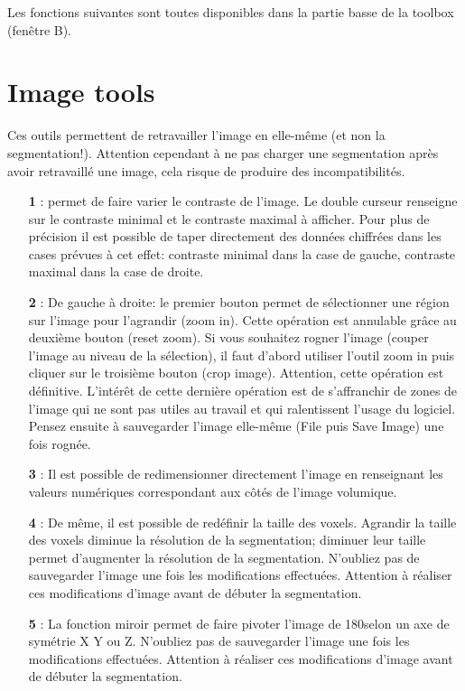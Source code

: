 \documentclass {article}
\begin{document}
Les fonctions suivantes sont toutes disponibles dans la partie basse de la toolbox (fenêtre B).

\section{Image tools}

Ces outils permettent de retravailler l'image en elle-même (et non la segmentation!). Attention cependant à ne pas charger une segmentation après avoir retravaillé une image, cela risque de produire des incompatibilités.

\begin{itemize}
	\item[\textbf{1}]: permet de faire varier le contraste de l'image. Le double curseur renseigne sur le contraste minimal et le contraste maximal à afficher. Pour plus de précision il est possible de taper directement des données chiffrées dans les cases prévues à cet effet: contraste minimal dans la case de gauche, contraste maximal dans la case de droite.
	\item[\textbf{2}]: De gauche à droite: le premier bouton permet de sélectionner une région sur l'image pour l'agrandir (zoom in). Cette opération est annulable grâce au deuxième bouton (reset zoom). Si vous souhaitez rogner l'image (couper l'image au niveau de la sélection), il faut d'abord utiliser l'outil zoom in puis cliquer sur le troisième bouton (crop image). Attention, cette opération est définitive. L'intérêt de cette dernière opération est de s'affranchir de zones de l'image qui ne sont pas utiles au travail et qui ralentissent l'usage du logiciel. Pensez ensuite à sauvegarder l'image elle-même (File puis Save Image) une fois rognée.
	\item[\textbf{3}]: Il est possible de redimensionner directement l'image en renseignant les valeurs numériques correspondant aux côtés de l'image volumique.
	\item[\textbf{4}]: De même, il est possible de redéfinir la taille des voxels. Agrandir la taille des voxels diminue la résolution de la segmentation; diminuer leur taille permet d'augmenter la résolution de la segmentation. N'oubliez pas de sauvegarder l'image une fois les modifications effectuées. Attention à réaliser ces modifications d'image avant de débuter la segmentation.
	\item[\textbf{5}]: La fonction miroir permet de faire pivoter l'image de 180\degre selon un axe de symétrie X Y ou Z. N'oubliez pas de sauvegarder l'image une fois les modifications effectuées. Attention à réaliser ces modifications d'image avant de débuter la segmentation.
	
\end{itemize}
\end{document}
